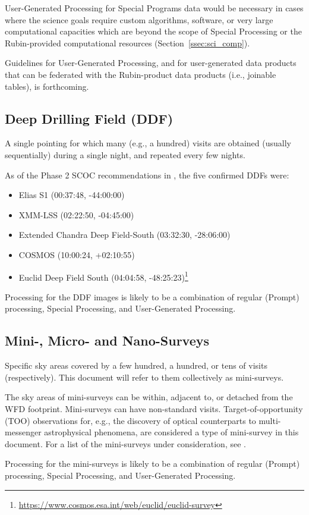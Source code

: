 User-Generated Processing for Special Programs data would be necessary in cases where
the science goals require custom algorithms, software, or very large computational
capacities which are beyond the scope of Special Processing or the Rubin-provided
computational resources (Section~\ref{ssec:sci_comp}).

Guidelines for User-Generated Processing, and for user-generated data products
that can be federated with the Rubin-product data products (i.e., joinable tables),
is forthcoming.

\subsection{Deep Drilling Field (DDF)}

A single pointing for which many (e.g., a hundred) visits are obtained 
(usually sequentially) during a single night, and repeated every few 
nights.

As of the Phase 2 SCOC recommendations in , the five 
confirmed DDFs were:

\begin{itemize}
\item Elias S1 (00:37:48, -44:00:00)
\item XMM-LSS (02:22:50, -04:45:00)
\item Extended Chandra Deep Field-South (03:32:30, -28:06:00)
\item COSMOS (10:00:24, +02:10:55)
\item Euclid Deep Field South  (04:04:58, -48:25:23)\footnote{\url{https://www.cosmos.esa.int/web/euclid/euclid-survey}}
\end{itemize}

Processing for the DDF images is likely to be a combination of regular (Prompt) processing,
Special Processing, and User-Generated Processing.

\subsection{Mini-, Micro- and Nano-Surveys}

Specific sky areas covered by a few hundred, a hundred, or tens of visits (respectively).
This document will refer to them collectively as mini-surveys.

The sky areas of mini-surveys can be within, adjacent to, or detached from the WFD footprint.
Mini-surveys can have non-standard visits.
Target-of-opportunity (TOO) observations for, e.g., the discovery of optical counterparts to 
multi-messenger astrophysical phenomena, are considered a type of mini-survey in this document.
For a list of the mini-surveys under consideration,
see .

Processing for the mini-surveys is likely to be a combination of regular (Prompt) processing,
Special Processing, and User-Generated Processing.
